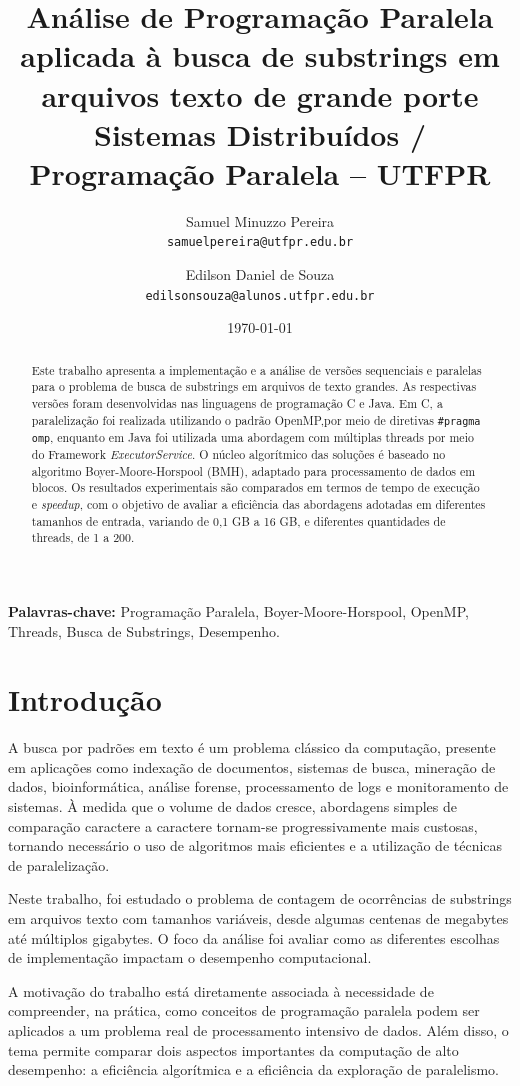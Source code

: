 \documentclass[10pt,twocolumn,a4paper]{article}
\title{\textbf{Análise de Programação Paralela aplicada à busca de substrings em arquivos texto de grande porte}\\
\large Sistemas Distribuídos / Programação Paralela -- UTFPR}
\author{
    Samuel Minuzzo Pereira \\
    \texttt{samuelpereira@utfpr.edu.br}
    \and
    Edilson Daniel de Souza \\
    \texttt{edilsonsouza@alunos.utfpr.edu.br}
}
\date{\today}
\begin{document}
\maketitle

\begin{abstract}
Este trabalho apresenta a implementação e a análise de versões sequenciais e paralelas para o problema de busca de substrings em arquivos de texto grandes. As respectivas versões foram desenvolvidas nas linguagens de programação C e Java. Em C, a paralelização foi realizada utilizando o padrão OpenMP,por meio de diretivas \texttt{\#pragma omp}, enquanto em Java foi utilizada uma abordagem com múltiplas threads por meio do Framework \textit{ExecutorService}. O núcleo algorítmico das soluções é baseado no algoritmo Boyer-Moore-Horspool (BMH), adaptado para processamento de dados em blocos. Os resultados experimentais são comparados em termos de tempo de execução e \textit{speedup}, com o objetivo de avaliar a eficiência das abordagens adotadas em diferentes tamanhos de entrada, variando de 0,1 GB a 16 GB, e diferentes quantidades de threads, de 1 a 200.
\end{abstract}

\textbf{Palavras-chave:} Programação Paralela, Boyer-Moore-Horspool, OpenMP, Threads, Busca de Substrings, Desempenho.


\section{Introdução}

A busca por padrões em texto é um problema clássico da computação, presente em aplicações como indexação de documentos, sistemas de busca, mineração de dados, bioinformática, análise forense, processamento de logs e monitoramento de sistemas. À medida que o volume de dados cresce, abordagens simples de comparação caractere a caractere tornam-se progressivamente mais custosas, tornando necessário o uso de algoritmos mais eficientes e a utilização de técnicas de paralelização.

Neste trabalho, foi estudado o problema de contagem de ocorrências de substrings em arquivos texto com tamanhos variáveis, desde algumas centenas de megabytes até múltiplos gigabytes. O foco da análise foi avaliar como as diferentes escolhas de implementação impactam o desempenho computacional.

A motivação do trabalho está diretamente associada à necessidade de compreender, na prática, como conceitos de programação paralela podem ser aplicados a um problema real de processamento intensivo de dados. Além disso, o tema permite comparar dois aspectos importantes da computação de alto desempenho: a eficiência algorítmica e a eficiência da exploração de paralelismo.
\end{document}

